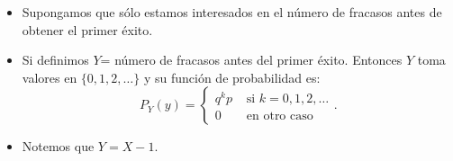 \documentclass{article}
\begin{document}
\begin{itemize}
\item Supongamos que sólo estamos interesados en el número de fracasos antes de obtener el
primer éxito. 
\item Si definimos $Y$= número de fracasos antes del primer éxito. Entonces $Y$ toma
valores en $\{0,1,2,\ldots\}$ y su función de probabilidad es:
$$P_Y(y)=\left\{\begin{array}{ll}
 q^k p & \mbox{ si } k=0,1,2,\ldots\\
 0 &\mbox{ en otro caso}
    \end{array}\right..$$
\item Notemos que $Y=X-1$.
\end{itemize}
\end{document}
